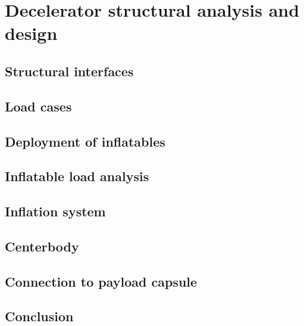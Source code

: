 \section{Decelerator structural analysis and design}\label{cha:structures}

\subsection{Structural interfaces}

\subsection{Load cases}

\subsection{Deployment of inflatables}

\subsection{Inflatable load analysis}

\subsection{Inflation system}

\subsection{Centerbody}

\subsection{Connection to payload capsule}

\subsection{Conclusion}
